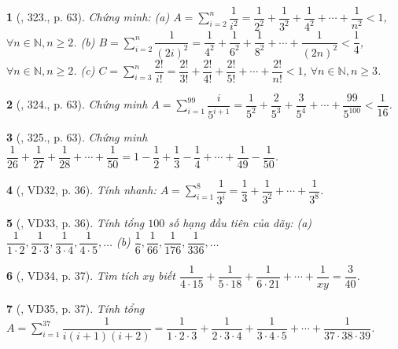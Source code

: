 \documentclass{article}
\newtheorem{baitoan}{}
\begin{document}
\begin{baitoan}[\cite{Tuyen_Toan_6}, 323., p. 63]
	Chứng minh: (a) $A = \sum_{i=2}^n \dfrac{1}{i^2} = \dfrac{1}{2^2} + \dfrac{1}{3^2} + \dfrac{1}{4^2} + \cdots + \dfrac{1}{n^2} < 1$, $\forall n\in\mathbb{N},n\ge2$. (b) $B = \sum_{i=2}^n \dfrac{1}{(2i)^2} = \dfrac{1}{4^2} + \dfrac{1}{6^2} + \dfrac{1}{8^2} + \cdots + \dfrac{1}{(2n)^2} < \dfrac{1}{4}$, $\forall n\in\mathbb{N},n\ge2$. (c) $C = \sum_{i=3}^n \dfrac{2!}{i!} = \dfrac{2!}{3!} + \dfrac{2!}{4!} + \dfrac{2!}{5!} + \cdots + \dfrac{2!}{n!} < 1$, $\forall n\in\mathbb{N},n\ge3$.
\end{baitoan}

\begin{baitoan}[\cite{Tuyen_Toan_6}, 324., p. 63]
	Chứng minh $A = \sum_{i=1}^{99} \dfrac{i}{5^{i+1}} = \dfrac{1}{5^2} + \dfrac{2}{5^3} + \dfrac{3}{5^4} + \cdots + \dfrac{99}{5^{100}} < \dfrac{1}{16}$.
\end{baitoan}

\begin{baitoan}[\cite{Tuyen_Toan_6}, 325., p. 63]
	Chứng minh $\dfrac{1}{26} + \dfrac{1}{27} + \dfrac{1}{28} + \cdots + \dfrac{1}{50} = 1 - \dfrac{1}{2} + \dfrac{1}{3} - \dfrac{1}{4} + \cdots + \dfrac{1}{49} - \dfrac{1}{50}$.
\end{baitoan}

\begin{baitoan}[\cite{Binh_Toan_6_tap_2}, VD32, p. 36]
	Tính nhanh: $A = \sum_{i=1}^8 \dfrac{1}{3^i} = \dfrac{1}{3} + \dfrac{1}{3^2} + \cdots + \dfrac{1}{3^8}$.
\end{baitoan}

\begin{baitoan}[\cite{Binh_Toan_6_tap_2}, VD33, p. 36]
	Tính tổng $100$ số hạng đầu tiên của dãy: (a) $\dfrac{1}{1\cdot2},\dfrac{1}{2\cdot3},\dfrac{1}{3\cdot4},\dfrac{1}{4\cdot5},\ldots$ (b) $\dfrac{1}{6},\dfrac{1}{66},\dfrac{1}{176},\dfrac{1}{336},\ldots$
\end{baitoan}

\begin{baitoan}[\cite{Binh_Toan_6_tap_2}, VD34, p. 37]
	Tìm tích $xy$ biết $\dfrac{1}{4\cdot15} + \dfrac{1}{5\cdot18} + \dfrac{1}{6\cdot21} + \cdots + \dfrac{1}{xy} = \dfrac{3}{40}$.
\end{baitoan}

\begin{baitoan}[\cite{Binh_Toan_6_tap_2}, VD35, p. 37]
	Tính tổng $A = \sum_{i=1}^{37} \dfrac{1}{i(i + 1)(i + 2)} = \dfrac{1}{1\cdot2\cdot3} + \dfrac{1}{2\cdot3\cdot4} + \dfrac{1}{3\cdot4\cdot5} + \cdots + \dfrac{1}{37\cdot38\cdot39}$.
\end{baitoan}
\end{document}
